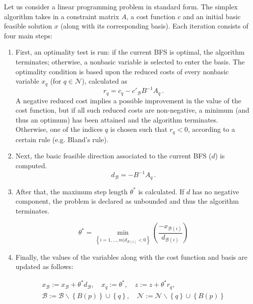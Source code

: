 \documentclass[a4paper]{article}
\begin{document}
Let us consider a linear programming problem in standard form. The simplex algorithm takes in a constraint matrix $A$, a cost function $c$ and an initial basic feasible solution $x$ (along with its corresponding basis). Each iteration consists of four main steps:

\begin{enumerate}[1)]
    \item First, an optimality test is run: if the current BFS is optimal, the algorithm terminates; otherwise, a nonbasic variable is selected to enter the basis. The optimality condition is based upon the reduced costs of every nonbasic variable $x_q$ (for $q\in\mathcal{N}$), calculated as
    \begin{equation}
        r_q = {c}_{q} - {c'}_{\mathcal{B}}{B}^{-1}{A}_{q}\,.
    \end{equation}
    A negative reduced cost implies a possible improvement in the value of the cost function, but if all such reduced costs are non-negative, a minimum (and thus an optimum) has been attained and the algorithm terminates. Otherwise, one of the indices $q$ is chosen such that $r_q < 0$, according to a certain rule (e.g. Bland's rule).

    \item Next, the basic feasible direction associated to the current BFS ($d$) is computed. 
    \begin{equation}
        {d}_{\mathcal{B}} ={-B}^{-1}{A}_{q}\,.
    \end{equation}
    
    \item After that, the maximum step length ${\theta}^{*}$ is calculated. If $d$ has no negative component, the problem is declared as unbounded and thus the algorithm terminates. 
    
    \begin{equation}
       { \theta  }^{ * }=\min _{ \left\{ i=1,...,m|{ d }_{ \mathcal{B}(i) }<0 \right\}  }{ \left( \frac { -{ x }_{ \mathcal{B}(i) } }{ { d }_{ \mathcal{B}(i) } }  \right)  } 
    \end{equation}
    
    \item Finally, the values of the variables along with the cost function and basis are updated as follows:
    
    \begin{equation}
    \begin{aligned}
        { x }_{ \mathcal{B} }:={ x }_{ \mathcal{B} }+{\theta}^{*}{d}_{\mathcal{B}}, \quad 
        {x}_{q}:={\theta}^{*},\quad
        z:=z+{\theta}^{*}{r}_{q}, \quad
        \\ \mathcal{B}:=\mathcal{B}\smallsetminus \left\{ B(p) \right\}\cup \left\{ q \right\}, \quad
        \mathcal{N} := \mathcal{N}\smallsetminus \left\{ q \right\} \cup \left\{ B(p) \right\}
    \end{aligned}
    \end{equation}
    
\end{enumerate}
\end{document}
